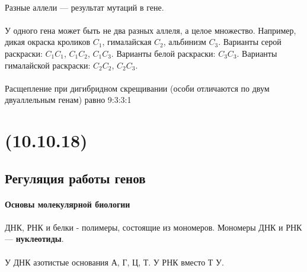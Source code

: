 \documentclass[dvipdfmx]{article}
\begin{document}
\paragraph{}
Разные аллели --- результат мутаций в гене.

\paragraph{}
У одного гена может быть не два разных аллеля, а целое множество.
Например, дикая окраска кроликов $C_1$, гималайская $C_2$, альбинизм $C_3$. Варианты серой раскраски: $C_1C_1$, $C_1C_2$, $C_1C_3$.
Варианты белой раскраски: $C_3C_3$. Варианты гималайской раскраски: $C_2C_2$, $C_2C_3$.

\paragraph{}
Расщепление при дигибридном скрещивании (особи отличаются по двум двуаллельным генам) равно 9:3:3:1

\newpage
\noindent\makebox[\linewidth]{\rule{\paperwidth}{0.4pt}}
\section{(10.10.18)}
\noindent\makebox[\linewidth]{\rule{\paperwidth}{0.4pt}}

\subsection{Регуляция работы генов}

\paragraph{Основы молекулярной биологии}
\paragraph{}

ДНК, РНК и белки - полимеры, состоящие из мономеров.
Мономеры ДНК и РНК --- \textbf{нуклеотиды}.

\paragraph{}

У ДНК азотистые основания А, Г, Ц, Т. У РНК вместо Т У.

\paragraph{}
\end{document}
